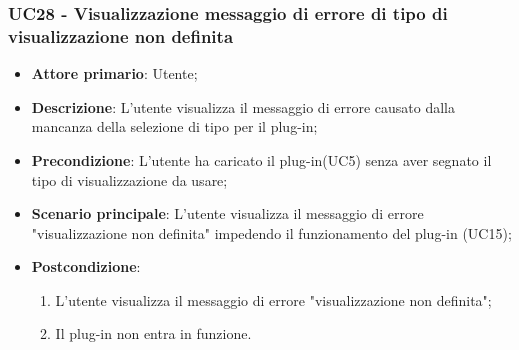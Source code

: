 \subsubsection{UC28 - Visualizzazione messaggio di errore di tipo di visualizzazione non definita}
\label{sssec:uc28}
\begin{itemize}
  \item \textbf{Attore primario}: Utente;
  \item \textbf{Descrizione}: L'utente visualizza il messaggio di errore causato dalla mancanza della selezione di tipo per il plug-in;
  \item \textbf{Precondizione}: L'utente ha caricato il plug-in(UC5) senza aver segnato il tipo di visualizzazione da usare;
  \item \textbf{Scenario principale}: L'utente visualizza il messaggio di errore "visualizzazione non definita" impedendo il funzionamento del plug-in (UC15);
  \item \textbf{Postcondizione}:
  \begin{enumerate}
		\item L'utente visualizza il messaggio di errore "visualizzazione non definita";
		\item Il plug-in non entra in funzione.
	\end{enumerate}
\end{itemize}

